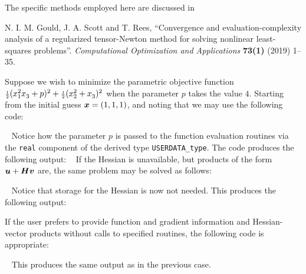 \documentclass{galahad}
\begin{document}
\noindent
The specific methods employed here are discussed in
\vspace*{1mm}

\noindent
N. I. M. Gould, J. A. Scott and T. Rees,
``Convergence and evaluation-complexity analysis of a regularized
tensor-Newton method for solving nonlinear least-squares problems''.
{\em Computational Optimization and Applications}
{\bf 73(1)} (2019) 1--35.


\galexamples
Suppose we wish to minimize the parametric objective function
${\scriptstyle \frac{1}{2}}  ( x_1^2 x_3^{} + p )^2 + {\scriptstyle \frac{1}{2}} (x_2^2 + x_3^{} )^2$
when the parameter $p$ takes the value $4$. Starting from the
initial guess ${\bm{x}} = (1,1,1)$, and noting that
we may use the following code:

{\tt \small
\VerbatimInput{\packageexample}
}
\noindent
Notice how the parameter $p$ is passed to the function evaluation
routines via the {\tt real} component of the derived type {\tt USERDATA\_type}.
The code produces the following output:
{\tt \small
\VerbatimInput{\packageresults}
}
\noindent
If the Hessian is unavailable, but products of the form
${\bm{u}} + {\bm{H}} {\bm{v}}$ are, the same problem may be solved as follows:

{\tt \small
\VerbatimInput{\packageexampleb}
}
\noindent
Notice that storage for the Hessian is now not needed.
This produces the %
following output:
{\tt \small
\VerbatimInput{\packageresultsb}
}
\noindent

If the user prefers to provide function and gradient information and
Hessian-vector products
without calls to specified routines, the following code is appropriate:

{\tt \small
\VerbatimInput{\packageexamplec}
}
\noindent
This produces the same output as in the previous case.
\noindent
\end{document}
